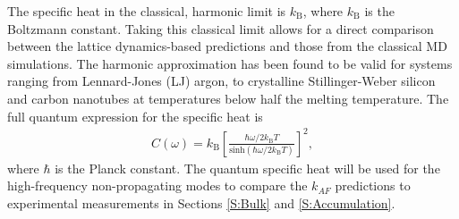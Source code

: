 \documentclass[aps,prb,onecolumn,preprint,superscriptaddress,footinbib,amsmath,amssymb,floatfix]{revtex4}
\begin{document}
The specific heat in the classical, harmonic limit is 
$k_{\text{B}}$, where $k_{\text{B}}$ is the Boltzmann constant.
\cite{mcquarrie_statistical_2000}
Taking this classical limit allows for a direct 
comparison between the lattice dynamics-based 
predictions and those from the classical MD simulations. 
The harmonic approximation has been found to be valid 
for systems ranging from 
Lennard-Jones (LJ) argon\cite{mcgaughey_quantitative_2004}, 
to crystalline Stillinger-Weber silicon 
and carbon nanotubes\cite{larkin_comparison_2012} at temperatures 
below half the melting temperature. 
The full quantum expression for the specific heat is
\cite{ziman_electrons_2001}
\begin{equation}\label{EQ:Cquantum}
\begin{split}
C(\omega) = k_{\text{B}}\left[\frac{\hbar\omega/2k_{\text{B}}T}
{\text{sinh}(\hbar\omega/2k_{\text{B}}T)}\right]^2,
\end{split}
\end{equation} 
where $\hbar$ is the Planck constant.\cite{ashcroft_solid_1976} 
The quantum specific heat will be used for the high-frequency 
non-propagating modes to compare the $k_{AF}$ predictions 
to experimental measurements in Sections \ref{S:Bulk} 
and \ref{S:Accumulation}. 
\end{document}
